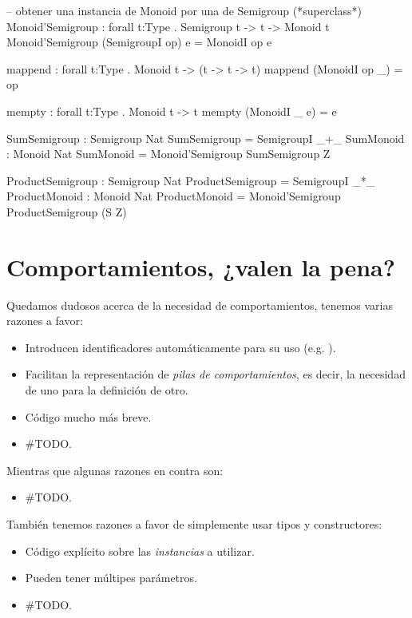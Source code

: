 {\begin{designfr}
\begin{anglercode}
-- obtener una instancia de Monoid por una de Semigroup (*superclass*)
Monoid'Semigroup : forall t:Type . Semigroup t -> t -> Monoid t
Monoid'Semigroup (SemigroupI op) e = MonoidI op e

mappend : forall t:Type . Monoid t -> (t -> t -> t)
mappend (MonoidI op _) = op

mempty : forall t:Type . Monoid t -> t
mempty (MonoidI _ e) = e

SumSemigroup : Semigroup Nat
SumSemigroup = SemigroupI _+_
SumMonoid : Monoid Nat
SumMonoid = Monoid'Semigroup SumSemigroup Z

ProductSemigroup : Semigroup Nat
ProductSemigroup = SemigroupI _*_
ProductMonoid : Monoid Nat
ProductMonoid = Monoid'Semigroup ProductSemigroup (S Z)
\end{anglercode}
\end{designfr}

\section{Comportamientos, ¿valen la pena?}

\begin{designfr}
Quedamos dudosos acerca de la necesidad de comportamientos, tenemos varias razones a favor:

\begin{itemize}
    \item Introducen identificadores automáticamente para su uso (e.g. ).
    \item Facilitan la representación de \emph{pilas de comportamientos}, es decir, la necesidad de uno para la definición de otro.
    \item Código mucho más breve.
    \item \#TODO.
\end{itemize}

Mientras que algunas razones en contra son:

\begin{itemize}
    \item \#TODO.
\end{itemize}

También tenemos razones a favor de simplemente usar tipos y constructores:

\begin{itemize}
    \item Código explícito sobre las \emph{instancias} a utilizar.
    \item Pueden tener múltipes parámetros.
    \item \#TODO.
\end{itemize}


\end{designfr}}
